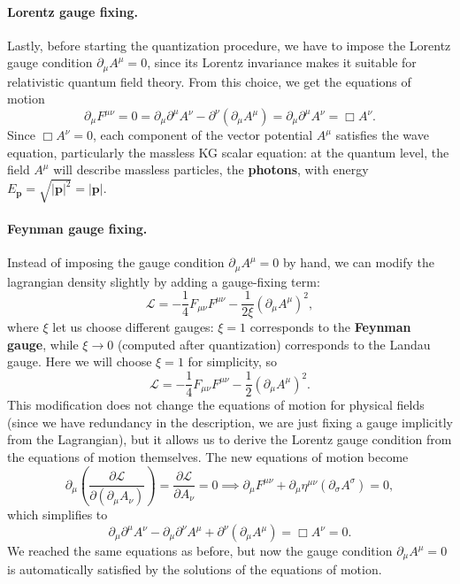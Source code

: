 \paragraph{Lorentz gauge fixing.}
Lastly, before starting the quantization procedure, we have to impose the Lorentz gauge condition \(\partial_\mu A^{\mu} = 0\), since its Lorentz invariance makes it suitable for relativistic quantum field theory. From this choice, we get the equations of motion
\[
    \partial_\mu F^{\mu \nu} = 0 = \partial_\mu \partial^\mu A^\nu - \partial^\nu (\partial_\mu A^\mu) = \partial_\mu \partial^\mu A^\nu = \Box A^{\nu}.
\]
Since \(\Box A^{\nu} = 0\), each component of the vector potential \(A^{\mu}\) satisfies the wave equation, particularly the massless KG scalar equation: at the quantum level, the field \(A^{\mu}\) will describe massless particles, the \textbf{photons}, with energy \(E_{\mathbf{p}} = \sqrt{\vert \mathbf{p} \vert^2} = \vert \mathbf{p} \vert \).

\paragraph{Feynman gauge fixing.}
Instead of imposing the gauge condition \(\partial_\mu A^{\mu} = 0\) by hand, we can modify the lagrangian density slightly by adding a gauge-fixing term:
\[
    \mathcal{L} = -\frac{1}{4} F_{\mu\nu} F^{\mu\nu} - \frac{1}{2\xi} (\partial_\mu A^{\mu})^2,
\]
where \(\xi\) let us choose different gauges: \(\xi = 1\) corresponds to the \textbf{Feynman gauge}, while \(\xi \to 0\) (computed after quantization) corresponds to the Landau gauge. Here we will choose \(\xi = 1\) for simplicity, so
\[
    \mathcal{L} = -\frac{1}{4} F_{\mu\nu} F^{\mu\nu} - \frac{1}{2} (\partial_\mu A^{\mu})^2.
\]
This modification does not change the equations of motion for physical fields (since we have redundancy in the description, we are just fixing a gauge implicitly from the Lagrangian), but it allows us to derive the Lorentz gauge condition from the equations of motion themselves. The new equations of motion become
\[
    \partial_\mu \left( \frac{\partial \mathcal{L}}{\partial (\partial_\mu A_\nu)} \right) = \frac{\partial \mathcal{L}}{\partial A_\nu} = 0 \implies \partial_\mu F^{\mu \nu} + \partial_\mu \eta^{\mu \nu} (\partial_\sigma A^{\sigma}) = 0,
\]
which simplifies to
\[
    \partial_\mu \partial^\mu A^\nu - \partial_\mu \partial^\nu A^\mu + \partial^\nu (\partial_\mu A^\mu) = \Box A^{\nu} = 0.
\]
We reached the same equations as before, but now the gauge condition \(\partial_\mu A^{\mu} = 0\) is automatically satisfied by the solutions of the equations of motion.

